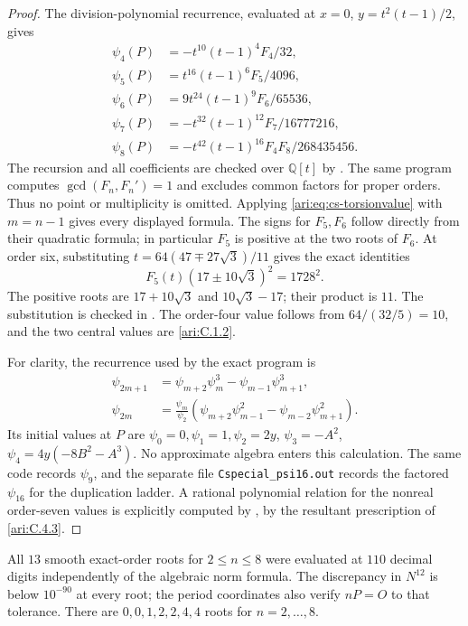 \begin{proof}
The division-polynomial recurrence, evaluated at $x=0$,
$y=t^2(t-1)/2$, gives
\[
 \begin{aligned}
 \psi_4(P)&=-t^{10}(t-1)^4F_4/32,\\
 \psi_5(P)&=t^{16}(t-1)^6F_5/4096,\\
 \psi_6(P)&=9t^{24}(t-1)^9F_6/65536,\\
 \psi_7(P)&=-t^{32}(t-1)^{12}F_7/16777216,\\
 \psi_8(P)&=-t^{42}(t-1)^{16}F_4F_8/268435456.
 \end{aligned}
\]
The recursion and all coefficients are checked over $\mathbb Q[t]$
by . The same program computes
$\gcd(F_n,F_n')=1$ and excludes common factors for proper orders.
Thus no point or multiplicity is omitted. Applying
\eqref{ari:eq:cs-torsionvalue} with $m=n-1$ gives every displayed
formula. The signs for $F_5,F_6$ follow directly from their quadratic
formula; in particular $F_5$ is positive at the two roots of $F_6$.
At order six, substituting
$t=64(47\mp27\sqrt3)/11$ gives the exact identities
\[
 F_5(t)(17\pm10\sqrt3)^2=1728^2.
\]
The positive roots are $17+10\sqrt3$ and $10\sqrt3-17$; their
product is $11$. The substitution is checked in
. The order-four value follows from
$64/(32/5)=10$, and the two central values are \ref{ari:C.1.2}.

For clarity, the recurrence used by the exact program is
\[
 \begin{aligned}
 \psi_{2m+1}&=\psi_{m+2}\psi_m^3-\psi_{m-1}\psi_{m+1}^3,\\
 \psi_{2m}&=\frac{\psi_m}{\psi_2}
   (\psi_{m+2}\psi_{m-1}^2-\psi_{m-2}\psi_{m+1}^2).
 \end{aligned}
\]
Its initial values at $P$ are $\psi_0=0,\psi_1=1,\psi_2=2y$,
$\psi_3=-A^2$, $\psi_4=4y(-8B^2-A^3)$. No approximate algebra
enters this calculation. The same code records $\psi_9$, and the
separate file \texttt{Cspecial\_psi16.out} records the factored
$\psi_{16}$ for the duplication ladder. A rational polynomial
relation for the nonreal order-seven values is explicitly computed
by , by the resultant prescription
of \ref{ari:C.4.3}.
\end{proof}

\begin{proposition}\label{ari:C.4.5}
All $13$ smooth exact-order roots for $2\le n\le8$ were evaluated
at $110$ decimal digits independently of the algebraic norm formula.
The discrepancy in $N^{12}$ is below $10^{-90}$ at every root;
the period coordinates also verify $nP=O$ to that tolerance.
There are $0,0,1,2,2,4,4$ roots for $n=2,\ldots,8$.
\end{proposition}

